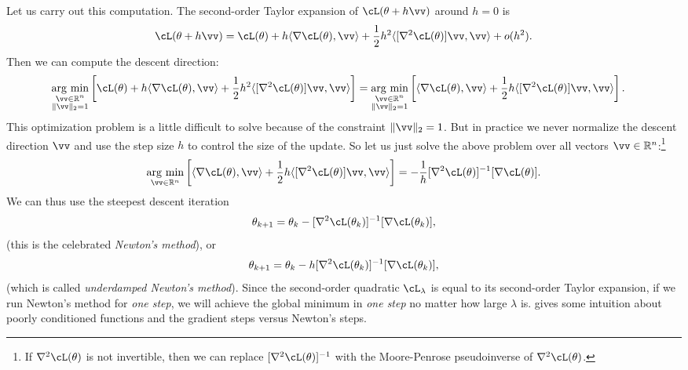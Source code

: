 \documentclass[../../book-main.tex]{subfiles}
\begin{document}
Let us carry out this computation. The second-order Taylor expansion of \(\cL(\theta + h\vv)\) around \(h = 0\) is 
\begin{equation}
    \cL(\theta + h\vv) = \cL(\theta) + h\ip{\nabla \cL(\theta)}{\vv} + \frac{1}{2}h^{2}\ip{[\nabla^{2}\cL(\theta)]\vv}{\vv} + o(h^{2}).
\end{equation}
Then we can compute the descent direction:
\begin{align}
    \argmin_{\substack{\vv \in \R^{n} \\ \norm{\vv}_{2} = 1}}\bs{\cL(\theta) + h\ip{\nabla \cL(\theta)}{\vv} + \frac{1}{2}h^{2}\ip{[\nabla^{2}\cL(\theta)]\vv}{\vv}} 
    &= \argmin_{\substack{\vv \in \R^{n} \\ \norm{\vv}_{2} = 1}}\bs{\ip{\nabla \cL(\theta)}{\vv} + \frac{1}{2}h\ip{[\nabla^{2}\cL(\theta)]\vv}{\vv}}.
\end{align}
This optimization problem is a little difficult to solve because of the constraint \(\norm{\vv}_{2} = 1\). But in practice we never normalize the descent direction \(\vv\) and use the step size \(h\) to control the size of the update. So let us just solve the above problem over all vectors \(\vv \in \R^{n}\):\footnote{If \(\nabla^{2}\cL(\theta)\) is not invertible, then we can replace \([\nabla^{2}\cL(\theta)]^{-1}\) with the Moore-Penrose pseudoinverse of \(\nabla^{2}\cL(\theta)\).}
\begin{equation}
    \argmin_{\vv \in \R^{n}}\bs{\ip{\nabla \cL(\theta)}{\vv} + \frac{1}{2}h\ip{[\nabla^{2}\cL(\theta)]\vv}{\vv}} = -\frac{1}{h}[\nabla^{2}\cL(\theta)]^{-1}[\nabla \cL(\theta)].
\end{equation}
We can thus use the steepest descent iteration 
\begin{equation}
    \theta_{k + 1} = \theta_{k} - [\nabla^{2}\cL(\theta_{k})]^{-1}[\nabla \cL(\theta_{k})],
\end{equation}
(this is the celebrated \textit{Newton's method}), or 
\begin{equation}
    \theta_{k + 1} = \theta_{k} - h[\nabla^{2}\cL(\theta_{k})]^{-1}[\nabla \cL(\theta_{k})],
\end{equation}
(which is called \textit{underdamped Newton's method}). Since the second-order quadratic \(\cL_{\lambda}\) is equal to its second-order Taylor expansion, if we run Newton's method for \textit{one step}, we will achieve the global minimum in \textit{one step} no matter how large \(\lambda\) is.  gives some intuition about poorly conditioned functions and the gradient steps versus Newton's steps.
\end{document}
